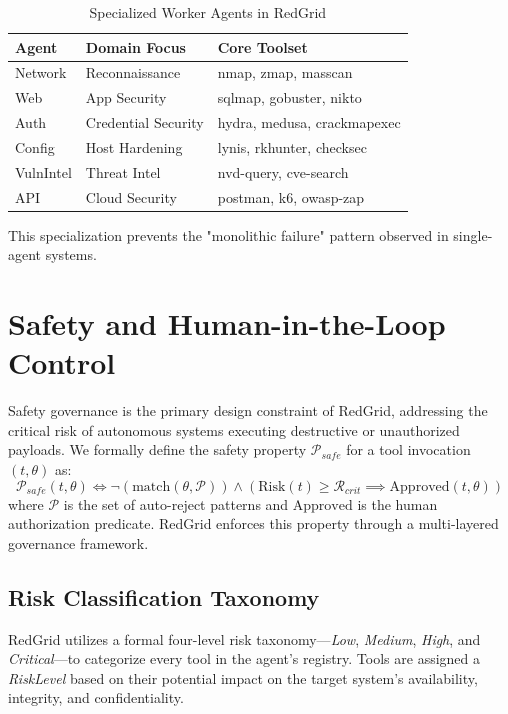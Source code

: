 \documentclass[conference,compsoc]{IEEEtran}
\begin{document}
\begin{table}[htbp]
\centering
\caption{Specialized Worker Agents in RedGrid}
\label{tab:agents}
\begin{tabular}{lll}
\toprule
\textbf{Agent} & \textbf{Domain Focus} & \textbf{Core Toolset} \\
\midrule
Network & Reconnaissance & nmap, zmap, masscan \\
Web & App Security & sqlmap, gobuster, nikto \\
Auth & Credential Security & hydra, medusa, crackmapexec \\
Config & Host Hardening & lynis, rkhunter, checksec \\
VulnIntel & Threat Intel & nvd-query, cve-search \\
API & Cloud Security & postman, k6, owasp-zap \\
\bottomrule
\end{tabular}
\end{table}

This specialization prevents the "monolithic failure" pattern observed in single-agent systems.

\section{Safety and Human-in-the-Loop Control} \label{sec:safety}
Safety governance is the primary design constraint of RedGrid, addressing the critical risk of autonomous systems executing destructive or unauthorized payloads. We formally define the safety property $\mathcal{P}_{safe}$ for a tool invocation $(t, \theta)$ as:
\begin{equation}
\mathcal{P}_{safe}(t, \theta) \iff \neg (\text{match}(\theta, \mathcal{P})) \wedge (\text{Risk}(t) \geq \mathcal{R}_{crit} \implies \text{Approved}(t, \theta))
\end{equation}
where $\mathcal{P}$ is the set of auto-reject patterns and $\text{Approved}$ is the human authorization predicate. RedGrid enforces this property through a multi-layered governance framework.

\subsection{Risk Classification Taxonomy}
RedGrid utilizes a formal four-level risk taxonomy---\textit{Low}, \textit{Medium}, \textit{High}, and \textit{Critical}---to categorize every tool in the agent's registry. Tools are assigned a \textit{RiskLevel} based on their potential impact on the target system's availability, integrity, and confidentiality.
\end{document}

